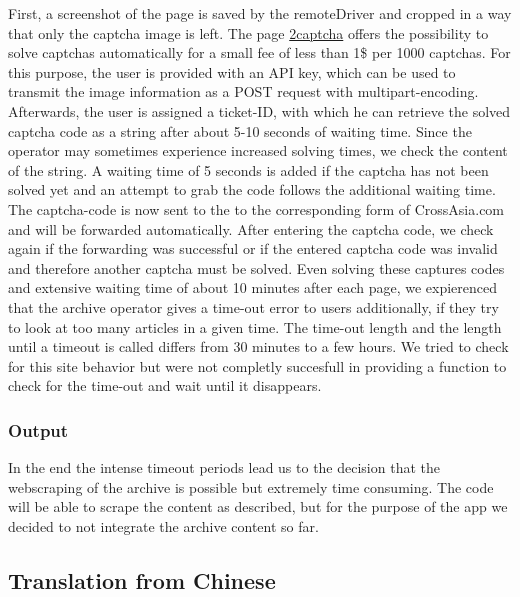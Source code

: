 \documentclass[12pt,a4paper]{article}
\begin{document}
First, a screenshot of the page is saved by the remoteDriver and cropped in a way that only the captcha image is left. The page \href{https://2captcha.com}{2captcha} offers the possibility to solve captchas automatically for a small fee of less than 1\$ per 1000 captchas. For this purpose, the user is provided with an API key, which can be used to transmit the image information as a POST request with multipart-encoding. Afterwards, the user is assigned a ticket-ID, with which he can retrieve the solved captcha code as a string after about 5-10 seconds of waiting time. Since the operator may sometimes experience increased solving times, we check the content of the string. A waiting time of 5 seconds is added if the captcha has not been solved yet and an attempt to grab the code follows the additional waiting time. The captcha-code is now sent to the to the corresponding form of CrossAsia.com and will be forwarded automatically. After entering the captcha code, we check again if the forwarding was successful or if the entered captcha code was invalid and therefore another captcha must be solved. Even solving these captures codes and extensive waiting time of about 10 minutes after each page, we expierenced that the archive operator gives a time-out error to users additionally, if they try to look at too many articles in a given time. The time-out length and the length until a timeout is called differs from 30 minutes to a few hours. We tried to check for this site behavior but were not completly succesfull in providing a function to check for the time-out and wait until it disappears.

\hypertarget{output}{%
\subsubsection{Output}\label{output}}

In the end the intense timeout periods lead us to the decision that the webscraping of the archive is possible but extremely time consuming. The code will be able to scrape the content as described, but for the purpose of the app we decided to not integrate the archive content so far.

\hypertarget{translation-from-chinese}{%
\subsection{Translation from Chinese}\label{translation-from-chinese}}
\end{document}
